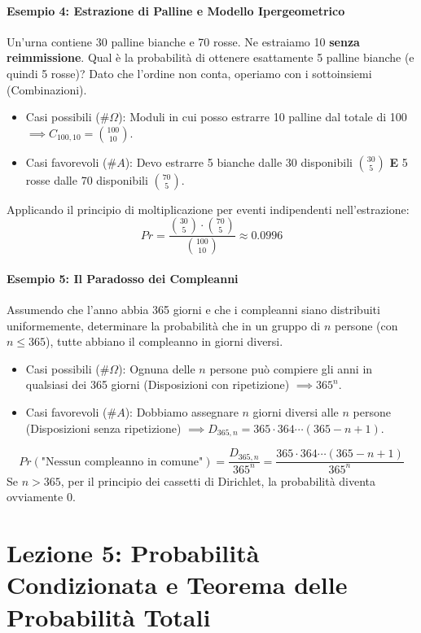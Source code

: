 \documentclass[12pt, a4paper]{article}
\begin{document}
\paragraph{Esempio 4: Estrazione di Palline e Modello Ipergeometrico}
Un'urna contiene 30 palline bianche e 70 rosse. Ne estraiamo 10 \textbf{senza reimmissione}. Qual è la probabilità di ottenere esattamente 5 palline bianche (e quindi 5 rosse)?
Dato che l'ordine non conta, operiamo con i sottoinsiemi (Combinazioni).
\begin{itemize}
    \item Casi possibili ($\#\Omega$): Moduli in cui posso estrarre 10 palline dal totale di 100 $\implies C_{100,10} = \binom{100}{10}$.
    \item Casi favorevoli ($\#A$): Devo estrarre 5 bianche dalle 30 disponibili $\binom{30}{5}$ \textbf{E} 5 rosse dalle 70 disponibili $\binom{70}{5}$.
\end{itemize}
Applicando il principio di moltiplicazione per eventi indipendenti nell'estrazione:
$$ Pr = \frac{\binom{30}{5} \cdot \binom{70}{5}}{\binom{100}{10}} \approx 0.0996 $$

\paragraph{Esempio 5: Il Paradosso dei Compleanni}
Assumendo che l'anno abbia 365 giorni e che i compleanni siano distribuiti uniformemente, determinare la probabilità che in un gruppo di $n$ persone (con $n \le 365$), tutte abbiano il compleanno in giorni diversi.
\begin{itemize}
    \item Casi possibili ($\#\Omega$): Ognuna delle $n$ persone può compiere gli anni in qualsiasi dei 365 giorni (Disposizioni con ripetizione) $\implies 365^n$.
    \item Casi favorevoli ($\#A$): Dobbiamo assegnare $n$ giorni diversi alle $n$ persone (Disposizioni senza ripetizione) $\implies D_{365,n} = 365 \cdot 364 \cdots (365 - n + 1)$.
\end{itemize}
$$ Pr(\text{"Nessun compleanno in comune"}) = \frac{D_{365,n}}{365^n} = \frac{365 \cdot 364 \cdots (365 - n + 1)}{365^n} $$
Se $n > 365$, per il principio dei cassetti di Dirichlet, la probabilità diventa ovviamente 0.

\section{Lezione 5: Probabilità Condizionata e Teorema delle Probabilità Totali}
\end{document}
